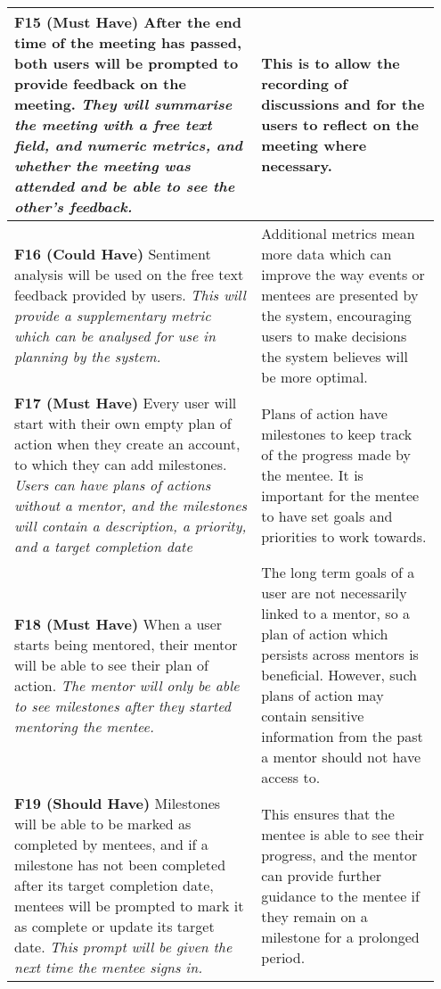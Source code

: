\documentclass[10pt]{article}
\begin{document}
\begin{longtable}{|p{0.55\linewidth}|p{0.4\linewidth}|}
    \textbf{F15 (Must Have) }
    After the end time of the meeting has passed, both users will be prompted to
    provide feedback on the meeting.
    \textit{They will summarise the meeting with a free text field, and numeric
    metrics, and whether the meeting was attended and be able to see the other's
    feedback.}
        &
    This is to allow the recording of discussions and for the users to reflect
    on the meeting where necessary.
    \\ \hline

    \textbf{F16 (Could Have) }
    Sentiment analysis will be used on the free text feedback provided by users.
    \textit{This will provide a supplementary metric which can be analysed for
    use in planning by the system.}
        &
    Additional metrics mean more data which can improve the way events or
    mentees are presented by the system, encouraging users to make decisions the
    system believes will be more optimal.
    \\ \hline


    \textbf{F17 (Must Have) }
    Every user will start with their own empty plan of action when they create
    an account, to which they can add milestones.
    \textit{Users can have plans of actions without a mentor, and the milestones
    will contain a description, a priority, and a target completion date}
        &
    Plans of action have milestones to keep track of the progress made by the
    mentee. It is important for the mentee to have set goals and priorities to
    work towards.
    \\ \hline

    \textbf{F18 (Must Have) }
    When a user starts being mentored, their mentor will be able to see their
    plan of action.
    \textit{The mentor will only be able to see milestones after they started
    mentoring the mentee.}
        &
    The long term goals of a user are not necessarily linked to a mentor, so
    a plan of action which persists across mentors is beneficial. However, such
    plans of action may contain sensitive information from the past a mentor
    should not have access to.
    \\ \hline

    \textbf{F19 (Should Have) }
    Milestones will be able to be marked as completed by mentees, and if a
    milestone has not been completed after its target completion date, mentees
    will be prompted to mark it as complete or update its target date.
    \textit{This prompt will be given the next time the mentee signs in.}
        &
    This ensures that the mentee is able to see their progress, and the mentor
    can provide further guidance to the mentee if they remain on a milestone for
    a prolonged period.
    \\ \hline


\end{longtable}
\end{document}
